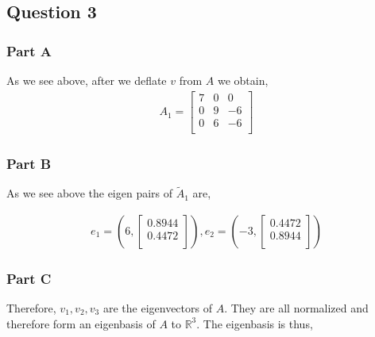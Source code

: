 \newpage
\subsection{Question 3}
\subsubsection{Part A}



As we see above, after we deflate \(v\) from \(A\) we obtain,
\begin{eqnarray}
  A_1 = 
  \begin{bmatrix}
    7 & 0 & 0 \\
    0 & 9 & -6 \\
    0 & 6 & -6 \\
    \end{bmatrix}
\end{eqnarray}

\newpage
\subsubsection{Part B}



As we see above the eigen pairs of \(\tilde{A}_1\) are,

\begin{eqnarray}
  e_1 = \left(6,
  \begin{bmatrix}
    0.8944 \\
    0.4472 \\
  \end{bmatrix}
  \right),
  e_2 = \left(-3,
    \begin{bmatrix}
      0.4472 \\
      0.8944 \\
    \end{bmatrix}
  \right)
\end{eqnarray}

\newpage
\subsubsection{Part C}



Therefore, \(v_1, v_2, v_3\) are the eigenvectors of \(A\).
They are all normalized and therefore form an eigenbasis of \(A\) to \(\mathbb{R}^{3}\).
The eigenbasis is thus,

